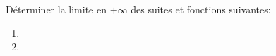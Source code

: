 \begin{exercice}
D\'eterminer la limite en $+\infty$ des suites et fonctions suivantes:
  \begin{enumerate}
  \item {}
  \item {}
    
  \end{enumerate}
 
\end{exercice}
